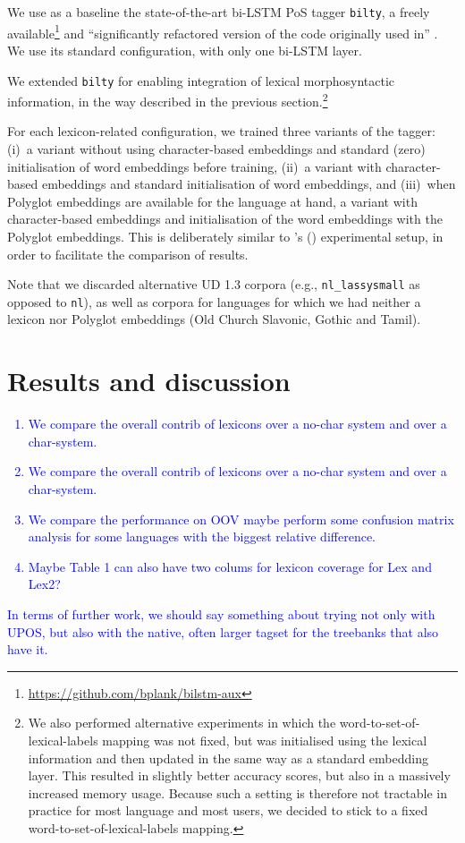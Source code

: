 \documentclass[11pt,letterpaper]{article}
\begin{document}
We use as a baseline the state-of-the-art bi-LSTM PoS tagger \texttt{bilty}, a freely
available\footnote{\url{https://github.com/bplank/bilstm-aux}} and ``significantly refactored version of the code
originally used in'' \cite{plank16}. We use its standard configuration, with only one bi-LSTM layer.

We extended \texttt{bilty} for enabling integration of lexical morphosyntactic information, in the way described in the
previous section.\footnote{We also performed alternative experiments in which the word-to-set-of-lexical-labels mapping
  was not fixed, but was initialised using the lexical information and then updated in the same way as a standard
  embedding layer. This resulted in slightly better accuracy scores, but also in a massively increased memory
  usage. Because such a setting is therefore not tractable in practice for most language and most users, we decided to
  stick to a fixed word-to-set-of-lexical-labels mapping.}

For each lexicon-related configuration, we trained three variants of the tagger: (i)~a variant without using
character-based embeddings and standard (zero) initialisation of word embeddings before training, (ii)~a variant with
character-based embeddings and standard initialisation of word embeddings, and (iii)~when Polyglot embeddings are
available for the language at hand, a variant with character-based embeddings and initialisation of the word embeddings
with the Polyglot embeddings. This is deliberately similar to \citeauthor{plank16}'s (\citeyear{plank16}) experimental
setup, in order to facilitate the comparison of results.

Note that we discarded alternative UD 1.3 corpora (e.g., {\tt nl\_lassysmall} as opposed to {\tt nl}), as well as
corpora for languages for which we had neither a lexicon nor Polyglot embeddings (Old Church Slavonic, Gothic and Tamil).


\section{Results and discussion}

\textcolor{blue}{
\begin{enumerate}
\item We compare the overall contrib of lexicons over a no-char system and over a char-system.
\item We compare the overall contrib of lexicons over a no-char system and over a char-system.
\item We compare the performance on OOV maybe perform some confusion matrix analysis for some languages with the biggest relative difference.
\item Maybe Table 1 can also have two colums for lexicon coverage for Lex and Lex2?
\end{enumerate}
In terms of further work, we should say something about trying not only with UPOS, but also with the native, often larger tagset for the treebanks that also have it.
}







\end{document}
